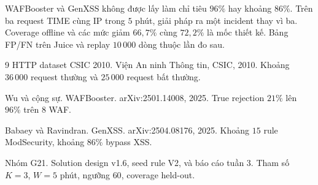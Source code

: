 \documentclass[a4paper,11pt]{article}
\begin{document}
WAFBooster và GenXSS không được lấy làm chỉ tiêu $96\%$ hay khoảng $86\%$. Trên ba request TIME cùng IP trong $5$ phút, giải pháp ra một incident thay vì ba. Coverage offline và các mức giảm $66{,}7\%$ cùng $72{,}2\%$ là mốc thiết kế. Bảng FP/FN trên Juice và replay $10\,000$ dòng thuộc lần đo sau.

\begin{thebibliography}{9}
HTTP dataset CSIC 2010.
Viện An ninh Thông tin, CSIC, 2010.
Khoảng $36\,000$ request thường và $25\,000$ request bất thường.

Wu và cộng sự.
WAFBooster.
arXiv:2501.14008, 2025.
True rejection $21\%$ lên $96\%$ trên $8$ WAF.

Babaey và Ravindran.
GenXSS.
arXiv:2504.08176, 2025.
Khoảng $15$ rule ModSecurity, khoảng $86\%$ bypass XSS.

Nhóm G21.
Solution design v1.6, seed rule V2, và báo cáo tuần 3.
Tham số $K{=}3$, $W{=}5$ phút, ngưỡng $60$, coverage held-out.
\end{thebibliography}
\end{document}
